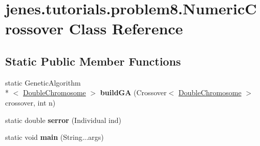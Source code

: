 \hypertarget{classjenes_1_1tutorials_1_1problem8_1_1_numeric_crossover}{\section{jenes.\-tutorials.\-problem8.\-Numeric\-Crossover Class Reference}
\label{classjenes_1_1tutorials_1_1problem8_1_1_numeric_crossover}
}
\subsection*{Static Public Member Functions}
\begin{DoxyCompactItemize}
\item 
\hypertarget{classjenes_1_1tutorials_1_1problem8_1_1_numeric_crossover_a8af3f285354dc96e81647a03d76d93c5}{static Genetic\-Algorithm\\*
$<$ \hyperlink{classjenes_1_1chromosome_1_1_double_chromosome}{Double\-Chromosome} $>$ {\bfseries build\-G\-A} (Crossover$<$ \hyperlink{classjenes_1_1chromosome_1_1_double_chromosome}{Double\-Chromosome} $>$ crossover, int n)}\label{classjenes_1_1tutorials_1_1problem8_1_1_numeric_crossover_a8af3f285354dc96e81647a03d76d93c5}

\item 
\hypertarget{classjenes_1_1tutorials_1_1problem8_1_1_numeric_crossover_aef1de8d283010a790fb20661fae423f2}{static double {\bfseries serror} (Individual ind)}\label{classjenes_1_1tutorials_1_1problem8_1_1_numeric_crossover_aef1de8d283010a790fb20661fae423f2}

\item 
\hypertarget{classjenes_1_1tutorials_1_1problem8_1_1_numeric_crossover_a11da9d09414921591a53cddb601cc203}{static void {\bfseries main} (String...\-args)}\label{classjenes_1_1tutorials_1_1problem8_1_1_numeric_crossover_a11da9d09414921591a53cddb601cc203}

\end{DoxyCompactItemize}
